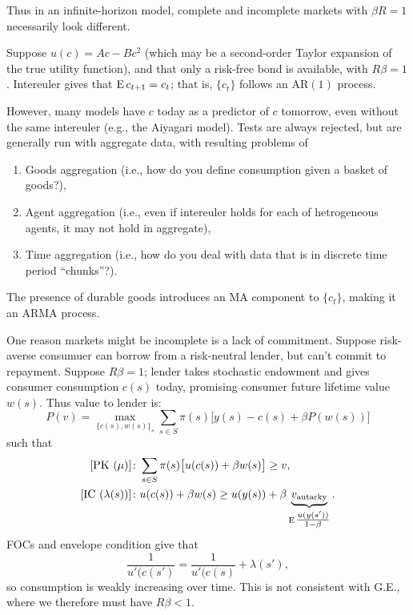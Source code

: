 \documentclass[8pt,letterpaper, landscape]{extarticle} %
\begin{document}
\begin{multicols}{3}
\begin{description}
Thus in an infinite-horizon model, complete and incomplete markets with $ \beta R = 1 $ necessarily look different.

 Suppose $ u(c) = Ac - B c^2 $ (which may be a second-order Taylor expansion of the true utility function), and that only a risk-free bond is available, with $ R \beta = 1 $. Intereuler gives that $ \operatorname{E} c_{t+1} = c_t $; that is, $ \{ c_t \} $ follows an $ \text{AR}(1) $ process.

However, many models have $ c $ today as a predictor of $ c $ tomorrow, even without the same intereuler (e.g., the Aiyagari model). Tests are always rejected, but are generally run with aggregate data, with resulting problems of
\begin{enumerate}
\item Goods aggregation (i.e., how do you define consumption given a basket of goods?),
\item Agent aggregation (i.e., even if intereuler holds for each of hetrogeneous agents, it may not hold in aggregate),
\item Time aggregation (i.e., how do you deal with data that is in discrete time period ``chunks''?).
\end{enumerate}

The presence of durable goods introduces an MA component to $ \{ c_t \} $, making it an ARMA process.

 One reason markets might be incomplete is a lack of commitment. Suppose risk-averse consumuer can borrow from a risk-neutral lender, but can't commit to repayment. Suppose $ R \beta = 1 $; lender takes stochastic endowment and gives consumer consumption $ c(s) $ today, promising consumer future lifetime value $ w(s) $. Thus value to lender is:
\[ P(v) = \max_{\{ c(s), w(s) \}_s} \sum_{s \in S} \pi (s) \bigl [ y(s) - c(s) + \beta P(w(s))  \bigr ] \]
such that
\begin{align*}
\text{[PK ($ \mu $)]} &\colon \sum_{s \in S} \pi (s) \bigl [ u(c(s)) + \beta w(s)  \bigr ] \geq v,  \\
\text{[IC ($ \lambda(s) $)]} &\colon u(c(s)) + \beta w(s) \geq u(y(s)) + \beta \underbrace{v_{\text{autarky}}}_{\operatorname{E} \tfrac{u(y(s'))}{1 - \beta}} .
\end{align*}
FOCs and envelope condition give that
\[ \frac{1}{u' (c(s')} = \frac{1}{u' (c(s)} + \lambda(s') , \]
so consumption is weakly increasing over time. This is not consistent with G.E., where we therefore must have $ R \beta < 1 $.


\end{description}
\end{multicols}
\end{document}
